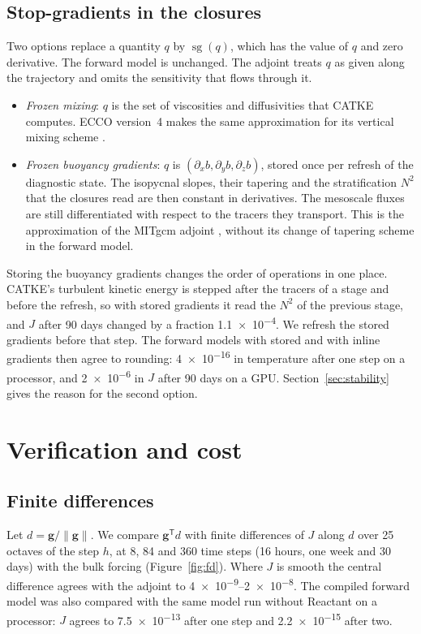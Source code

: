 \documentclass[11pt]{article}
\newcommand{\gvec}{\mathbf{g}}
\newcommand{\sg}{\operatorname{sg}}
\begin{document}
\subsection{Stop-gradients in the closures}
\label{sec:frozen}

Two options replace a quantity $q$ by $\sg(q)$, which has the value of $q$ and zero derivative. The forward model
is unchanged. The adjoint treats $q$ as given along the trajectory and omits the sensitivity that flows through it.
\begin{itemize}
  \item \emph{Frozen mixing}: $q$ is the set of viscosities and diffusivities that CATKE computes. ECCO
        version~4 makes the same approximation for its vertical mixing scheme \citep{forget2015}.
  \item \emph{Frozen buoyancy gradients}: $q$ is $(\partial_x b, \partial_y b, \partial_z b)$, stored once per
        refresh of the diagnostic state. The isopycnal slopes, their tapering and the stratification $N^2$ that the
        closures read are then constant in derivatives. The mesoscale fluxes are still differentiated with respect
        to the tracers they transport. This is the approximation of the MITgcm adjoint \citep{forget2015},
        without its change of tapering scheme in the forward model.
\end{itemize}
Storing the buoyancy gradients changes the order of operations in one place. CATKE's turbulent kinetic energy is
stepped after the tracers of a stage and before the refresh, so with stored gradients it read the $N^2$ of the
previous stage, and $J$ after 90 days changed by a fraction \num{1.1e-4}. We refresh the stored gradients before
that step. The forward models with stored and with inline gradients then agree to rounding: \num{4e-16} in
temperature after one step on a processor, and \num{2e-6} in $J$ after 90 days on a GPU. Section~\ref{sec:stability}
gives the reason for the second option.

\section{Verification and cost}
\label{sec:verification}

\subsection{Finite differences}

Let $d = \gvec/\lVert\gvec\rVert$. We compare $\gvec^{\mathsf T}d$ with finite differences of $J$ along $d$ over 25
octaves of the step $h$, at 8, 84 and 360 time steps (16 hours, one week and 30 days) with the bulk forcing
(Figure~\ref{fig:fd}). Where $J$ is smooth the central difference agrees with the adjoint to \numrange{4e-9}{2e-8}.
The compiled forward model was also compared with the same model run without Reactant on a processor: $J$ agrees
to \num{7.5e-13} after one step and \num{2.2e-15} after two.
\end{document}
